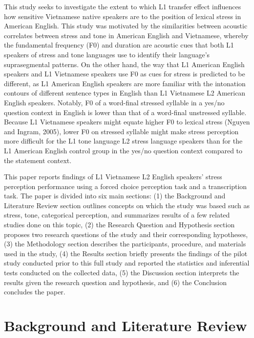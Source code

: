 \documentclass[a4paper]{article}
\begin{document}
This study seeks to investigate the extent to which L1 transfer effect influences how sensitive Vietnamese native speakers are to the position of lexical stress in American English. This study was motivated by the similarities between acoustic correlates between stress and tone in American English and Vietnamese, whereby the fundamental frequency (F0) and duration are acoustic cues that both L1 speakers of stress and tone languages use to identify their language's suprasegmental patterns. On the other hand, the way that L1 American English speakers and L1 Vietnamese speakers use F0 as cues for stress is predicted to be different, as L1 American English speakers are more familiar with the intonation contours of different sentence types in English than L1 Vietnamese L2 American English speakers. Notably, F0 of a word-final stressed syllable in a yes/no question context in English is lower than that of a word-final unstressed syllable. Because L1 Vietnamese speakers might equate higher F0 to lexical stress (Nguyen and Ingram, 2005), lower F0 on stressed syllable might make stress perception more difficult for the L1 tone language L2 stress language speakers than for the L1 American English control group in the yes/no question context compared to the statement context.



This paper reports findings of L1 Vietnamese L2 English speakers' stress perception performance using a forced choice perception task and a transcription task. The paper is divided into six main sections: (1) the Background and Literature Review section outlines concepts on which the study was based such as stress, tone, categorical perception, and summarizes results of a few related studies done on this topic, (2) the Research Question and Hypothesis section proposes two research questions of the study and their corresponding hypotheses, (3) the Methodology section describes the participants, procedure, and materials used in the study, (4) the Results section briefly presents the findings of the pilot study conducted prior to this full study and reported the statistics and inferential tests conducted on the collected data, (5) the Discussion section interprets the results given the research question and hypothesis, and (6) the Conclusion concludes the paper.

\section{Background and Literature Review}
\end{document}
